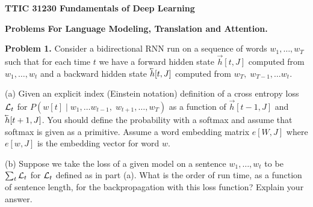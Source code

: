 \documentclass{article}
\begin{document}
\centerline{\bf TTIC 31230 Fundamentals of Deep Learning}
\medskip
\centerline{\bf Problems For Language Modeling, Translation and Attention.}

\bigskip
\bigskip
{\bf Problem 1.} Consider a bidirectional RNN run on a sequence of words $w_1,\ldots,w_T$ such that for each time $t$ we have a forward
hidden state $\vec{h}[t,J]$ computed from $w_1,\ldots,w_t$ and a backward hidden state $\cev{h}[t,J]$ computed from $w_T,\;w_{T-1},\ldots w_t$.

\medskip
(a) Given an explicit index (Einstein notation) definition of a cross entropy loss ${\cal L}_t$ for $P(w[t]\;|\;w_1,\ldots w_{t-1},\;w_{t+1},\ldots,w_T)$ as a function of
$\vec{h}[t-1,J]$ and $\cev{h}[t+1,J]$. You should define
the probability with a softmax and assume that softmax is given as a primitive.  Assume a word embedding matrix $e[W,J]$ where $e[w,J]$ is the embedding vector for word $w$.

\medskip
(b) Suppose we take the loss of a given model on a sentence $w_1,\ldots,w_t$ to be $\sum_t {\cal L}_t$ for ${\cal L}_t$ defined as in part (a).  What is the order
of run time, as a function of sentence length, for the backpropagation with this loss function?  Explain your answer.
\end{document}
